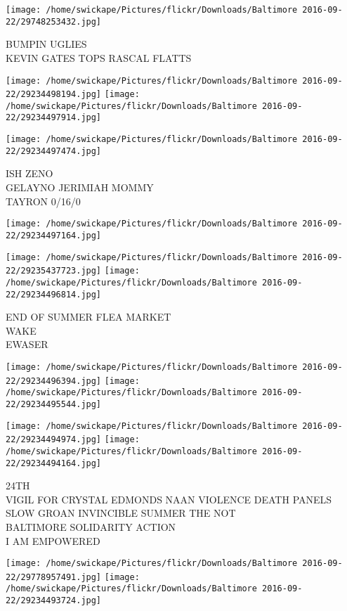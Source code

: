 \documentclass[10pt,letterpaper]{article}
\begin{document}
\vspace{0.25in}
\texttt{[image: /home/swickape/Pictures/flickr/Downloads/Baltimore 2016-09-22/29748253432.jpg]}

BUMPIN UGLIES\\
KEVIN GATES TOPS RASCAL FLATTS
\pagebreak

\texttt{[image: /home/swickape/Pictures/flickr/Downloads/Baltimore 2016-09-22/29234498194.jpg]}
\texttt{[image: /home/swickape/Pictures/flickr/Downloads/Baltimore 2016-09-22/29234497914.jpg]}

\vspace{0.25in}
\texttt{[image: /home/swickape/Pictures/flickr/Downloads/Baltimore 2016-09-22/29234497474.jpg]}

ISH ZENO\\
GELAYNO JERIMIAH MOMMY\\
TAYRON 0/16/0
\pagebreak

\texttt{[image: /home/swickape/Pictures/flickr/Downloads/Baltimore 2016-09-22/29234497164.jpg]}

\vspace{0.25in}
\texttt{[image: /home/swickape/Pictures/flickr/Downloads/Baltimore 2016-09-22/29235437723.jpg]}
\texttt{[image: /home/swickape/Pictures/flickr/Downloads/Baltimore 2016-09-22/29234496814.jpg]}

END OF SUMMER FLEA MARKET\\
WAKE\\
EWASER
\pagebreak

\texttt{[image: /home/swickape/Pictures/flickr/Downloads/Baltimore 2016-09-22/29234496394.jpg]}
\texttt{[image: /home/swickape/Pictures/flickr/Downloads/Baltimore 2016-09-22/29234495544.jpg]}

\texttt{[image: /home/swickape/Pictures/flickr/Downloads/Baltimore 2016-09-22/29234494974.jpg]}
\texttt{[image: /home/swickape/Pictures/flickr/Downloads/Baltimore 2016-09-22/29234494164.jpg]}

24TH\\
VIGIL FOR CRYSTAL EDMONDS NAAN VIOLENCE DEATH PANELS SLOW GROAN INVINCIBLE SUMMER THE NOT\\
BALTIMORE SOLIDARITY ACTION\\
I AM EMPOWERED
\pagebreak

\texttt{[image: /home/swickape/Pictures/flickr/Downloads/Baltimore 2016-09-22/29778957491.jpg]}
\texttt{[image: /home/swickape/Pictures/flickr/Downloads/Baltimore 2016-09-22/29234493724.jpg]}
\end{document}

